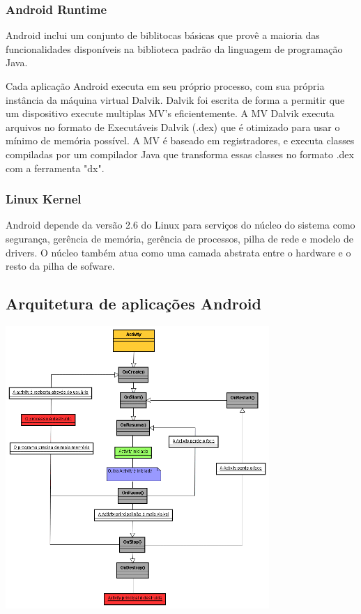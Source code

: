 \documentclass[a4paper,12pt]{report}
\begin{document}
\subsubsection{Android Runtime}

Android inclui um conjunto de biblitocas básicas que provê a maioria das funcionalidades
disponíveis na biblioteca padrão da linguagem de programação Java.

Cada aplicação Android executa em seu próprio processo, com sua própria instância 
da máquina virtual Dalvik. Dalvik foi escrita de forma a permitir que um dispositivo
execute multiplas MV's eficientemente. A MV Dalvik executa arquivos no formato de 
Executáveis Dalvik (.dex) que é otimizado para usar o mínimo de memória possível. 
A MV é baseado em registradores, e executa classes compiladas por um compilador Java 
que transforma essas classes no formato .dex com a ferramenta "dx".

\subsubsection{Linux Kernel}

Android depende da versão 2.6 do Linux para serviços do núcleo do sistema como 
segurança, gerência de memória, gerência de processos, pilha de rede e modelo de 
drivers. O núcleo também atua como uma camada abstrata entre o hardware e o resto
da pilha de sofware.

\subsection{Arquitetura de aplicações Android}

\includegraphics[width=10cm]{img/Activity_lifecycle}
\end{document}
